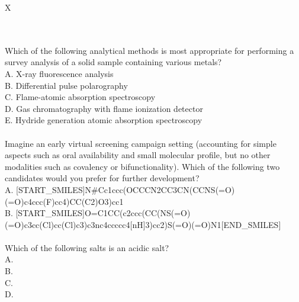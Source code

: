 \begin{xltabular}{\textwidth}{X}
    \caption{\textbf{Examples for each of the topics considered in the evaluation of the \chembench corpus.} The table shows the percentage of questions in the corpus that belong to each topic, as well as example questions.} \label{tab:chembench_corpus_topic} \\
            \toprule
             \\
            \midrule
            Which of the following analytical methods is most appropriate for performing a survey analysis of a solid sample containing various metals? \\
            A. X-ray fluorescence analysis \\
            B. Differential pulse polarography \\
            C. Flame-atomic absorption spectroscopy \\
            D. Gas chromatography with flame ionization detector \\
            E. Hydride generation atomic absorption spectroscopy \\
            \midrule
             \\
            \midrule
            Imagine an early virtual screening campaign setting (accounting for simple aspects such as oral availability and small molecular profile, but no other modalities such as covalency or bifunctionality). Which of the following two candidates would you prefer for further development? \\
            A. [START\_SMILES]N\#Cc1ccc(OCCCN2CC3CN\-(CCNS(=O)(=O)c4ccc(F)cc4)CC(C2)O3)cc1 \\
            B. [START\_SMILES]O=C1CC(c2ccc(CC(NS(=O)\-(=O)\-c3cc(Cl)cc(Cl)c3)c3nc4ccccc4[nH]3)cc2)S\-(=O)\-(=O)N1[END\_SMILES] \\
            \midrule
             \\
            \midrule
            Which of the following salts is an acidic salt? \\
            A.  \\
            B.  \\
            C.  \\
            D.  \\

\end{xltabular}
